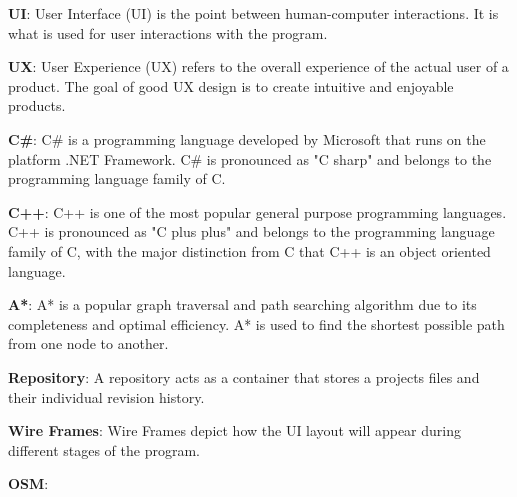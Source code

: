 \noindent
\label{itm:ui}\textbf{UI}: User Interface (UI) is the point between human-computer interactions. It is what is used for user interactions with the program. 

\noindent
\label{itm:ux}\textbf{UX}: User Experience (UX) refers to the overall experience of the actual user of a product. The goal of good UX design is to create intuitive and enjoyable products.

\noindent
\label{itm:csharp}\textbf{C\#}: C\# is a programming language developed by Microsoft that runs on the platform .NET Framework. C\# is pronounced as "C sharp" and belongs to the programming language family of C.

\noindent
\label{itm:c++}\textbf{C++}: C++ is one of the most popular general purpose programming languages. C++ is pronounced as "C plus plus" and belongs to the programming language family of C, with the major distinction from C that C++ is an object oriented language.

\noindent
\label{itm:a*}\textbf{A*}: A* is a popular graph traversal and path searching algorithm due to its completeness and optimal efficiency. A* is used to find the shortest possible path from one node to another.

\noindent
\label{itm:repository}\textbf{Repository}: A repository acts as a container that stores a projects files and their individual revision history. 

\noindent
\label{itm:wire-frame}\textbf{Wire Frames}: Wire Frames depict how the UI layout will appear during different stages of the program. 

\noindent
\label{itm:cubic-bézier-curve}\textbf{OSM}: 






